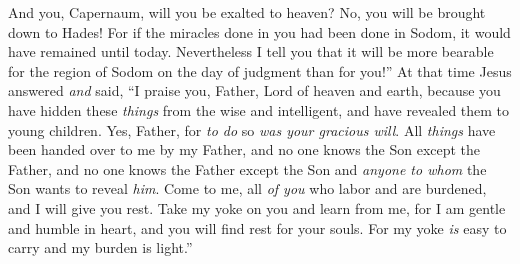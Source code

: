 \begin{biblechapter}
\verse And you, Capernaum, will you be exalted to heaven? No, you will be brought down to Hades! For if the miracles done in you had been done in Sodom, it would have remained until today.
\verse Nevertheless I tell you that it will be more bearable for the region of Sodom on the day of judgment than for you!”
 At that time Jesus answered \textit{and} said, “I praise you, Father, Lord of heaven and earth, because you have hidden these \textit{things} from the wise and intelligent, and have revealed them to young children.
\verse Yes, Father, for \textit{to do} so \textit{was your gracious will}.
\verse All \textit{things} have been handed over to me by my Father, and no one knows the Son except the Father, and no one knows the Father except the Son and \textit{anyone to whom} the Son wants to reveal \textit{him}.
\verse Come to me, all \textit{of you} who labor and are burdened, and I will give you rest.
\verse Take my yoke on you and learn from me, for I am gentle and humble in heart, and you will find rest for your souls.
\verse For my yoke \textit{is} easy to carry and my burden is light.”
\end{biblechapter}

